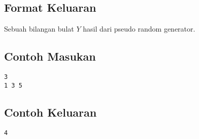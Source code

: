 \documentclass{article}
\begin{document}
\subsection*{Format Keluaran}

Sebuah bilangan bulat $Y$ hasil dari pseudo random generator.
\\

\begin{multicols}{2}
\subsection*{Contoh Masukan}
\begin{lstlisting}
3
1 3 5
\end{lstlisting}
\columnbreak
\subsection*{Contoh Keluaran}
\begin{lstlisting}
4
\end{lstlisting}
\vfill
\null
\end{multicols}


\pagebreak
\end{document}
